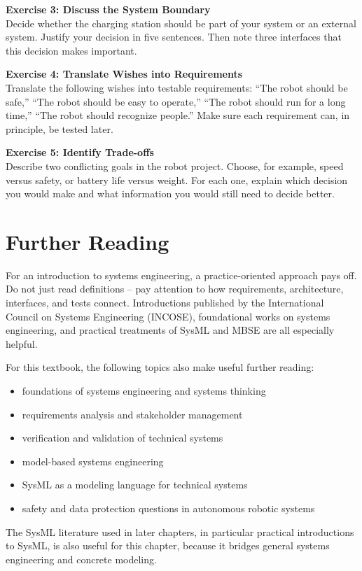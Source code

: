 \begin{uebungbox}
\textbf{Exercise 3: Discuss the System Boundary}\\
Decide whether the charging station should be part of your system or an external system. Justify your decision in five sentences. Then note three interfaces that this decision makes important.
\end{uebungbox}

\begin{uebungbox}
\textbf{Exercise 4: Translate Wishes into Requirements}\\
Translate the following wishes into testable requirements: \enquote{The robot should be safe,} \enquote{The robot should be easy to operate,} \enquote{The robot should run for a long time,} \enquote{The robot should recognize people.} Make sure each requirement can, in principle, be tested later.
\end{uebungbox}

\begin{uebungbox}
\textbf{Exercise 5: Identify Trade-offs}\\
Describe two conflicting goals in the robot project. Choose, for example, speed versus safety, or battery life versus weight. For each one, explain which decision you would make and what information you would still need to decide better.
\end{uebungbox}

\section{Further Reading}

For an introduction to systems engineering, a practice-oriented approach pays off. Do not just read definitions -- pay attention to how requirements, architecture, interfaces, and tests connect. Introductions published by the International Council on Systems Engineering (INCOSE), foundational works on systems engineering, and practical treatments of SysML and MBSE are all especially helpful.

For this textbook, the following topics also make useful further reading:

\begin{itemize}
    \item foundations of systems engineering and systems thinking
    \item requirements analysis and stakeholder management
    \item verification and validation of technical systems
    \item model-based systems engineering
    \item SysML as a modeling language for technical systems
    \item safety and data protection questions in autonomous robotic systems
\end{itemize}

The SysML literature used in later chapters, in particular practical introductions to SysML, is also useful for this chapter, because it bridges general systems engineering and concrete modeling.
